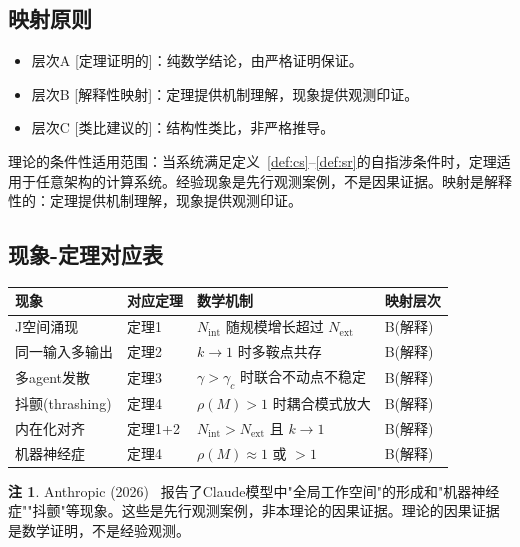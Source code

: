 \documentclass[12pt,a4paper]{article}
\theoremstyle{definition}
\newtheorem{remark}[theorem]{注}
\newcommand{\Nint}{N_{\mathrm{int}}}
\newcommand{\Next}{N_{\mathrm{ext}}}
\newcommand{\gamc}{\gamma_c}
\begin{document}
\subsection{映射原则}

\begin{itemize}[leftmargin=*]
\item 层次A [定理证明的]：纯数学结论，由严格证明保证。
\item 层次B [解释性映射]：定理提供机制理解，现象提供观测印证。
\item 层次C [类比建议的]：结构性类比，非严格推导。
\end{itemize}

理论的条件性适用范围：当系统满足定义~\ref{def:cs}--\ref{def:sr}的自指涉条件时，定理适用于任意架构的计算系统。经验现象是先行观测案例，不是因果证据。映射是解释性的：定理提供机制理解，现象提供观测印证。

\subsection{现象-定理对应表}

\begin{longtable}{p{} p{} p{} p{}}
\toprule
现象 & 对应定理 & 数学机制 & 映射层次 \\
\midrule
J空间涌现 & 定理1 & $\Nint$ 随规模增长超过 $\Next$ & B(解释) \\
同一输入多输出 & 定理2 & $k \to 1$ 时多鞍点共存 & B(解释) \\
多agent发散 & 定理3 & $\gamma > \gamc$ 时联合不动点不稳定 & B(解释) \\
抖颤(thrashing) & 定理4 & $\rho(M) > 1$ 时耦合模式放大 & B(解释) \\
内在化对齐 & 定理1+2 & $\Nint > \Next$ 且 $k \to 1$ & B(解释) \\
机器神经症 & 定理4 & $\rho(M) \approx 1$ 或 $> 1$ & B(解释) \\
\bottomrule
\end{longtable}

\begin{remark}
Anthropic (2026)~\cite{Anthropic2026a, Anthropic2026b} 报告了Claude模型中"全局工作空间"的形成和"机器神经症""抖颤"等现象。这些是先行观测案例，非本理论的因果证据。理论的因果证据是数学证明，不是经验观测。
\end{remark}
\end{document}
